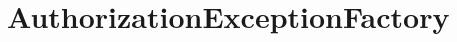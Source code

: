 \ClearAPI
\section{AuthorizationExceptionFactory}
\label{feature:AuthorizationExceptionFactory}
\ClearAPI
\TODO